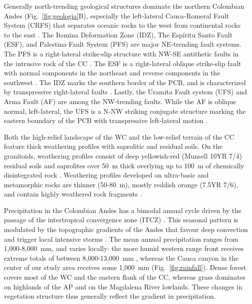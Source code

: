 \documentclass[draft]{agujournal2019}
\begin{document}
\par Generally north-trending geological structures dominate the northern Colombian Andes (Fig.~\ref{fig:geologia}B), especially the left-lateral Cauca-Romeral Fault System (CRFS) that separates oceanic rocks to the west from continental rocks to the east \cite{Egholm2013, ego1995}. The Itsmina Deformation Zone (IDZ), The Espíritu Santo Fault (ESF), and Palestina Fault System (PFS) are major NE-trending fault systems. The PFS is a right-lateral strike-slip structure with NW-SE antithetic faults in the intrusive rock of the CC \cite{acosta2007, feininger1970}. The ESF is a right-lateral oblique strike-slip fault with normal components in the northeast and reverse components in the southwest \cite{Noriega2020, page1986}. The IDZ marks the southern border of the PCB, and is characterized by transpressive right-lateral faults \cite{acosta2007, Taboada2000}. Lastly, the Uramita Fault system (UFS) and Arma Fault (AF) are among the NW-trending faults. While the AF is oblique normal, left-lateral, the UFS is a N-NW striking conjugate structure marking the eastern boundary of the PCB with transpressive left-lateral motion \cite{acosta2007, Taboada2000}.

\par Both the high-relief landscape of the WC and the low-relief terrain of the CC feature thick weathering profiles with saprolitic and residual soils. On the granitoids, weathering profiles consist of deep yellowish-red (Munsell 10YR 7/4) residual soils and saprolites over 50~m thick overlying up to 100~m of chemically disintegrated rock \cite{aristizabal2005tropical}. Weathering profiles developed on ultra-basic and metamorphic rocks are thinner (50-80~m), mostly reddish orange (7.5YR 7/6), and contain highly weathered rock fragments \cite{aristizabal2005tropical}.

\par Precipitation in the Colombian Andes has a bimodal annual cycle driven by the passage of the intertropical convergence zone (ITCZ) \cite{bedoya2019}. This seasonal pattern is modulated by the topographic gradients of the Andes that favour deep convection and trigger local intensive storms \cite{Poveda2011}. The mean annual precipitation ranges from 1,000-8,000~mm, and varies locally: the more humid western range front receives extreme totals of between 8,000-13,000~mm \cite{poveda2000existence,smith2006progress}, whereas the Cauca canyon in the center of our study area receives some 1,000~mm (Fig.~\ref{fig:rainfall}). Dense forest covers most of the WC and the eastern flank of the CC, whereas grass dominates on highlands of the AP and on the Magdalena River lowlands. These changes in vegetation structure thus generally reflect the gradient in precipitation.
\end{document}
